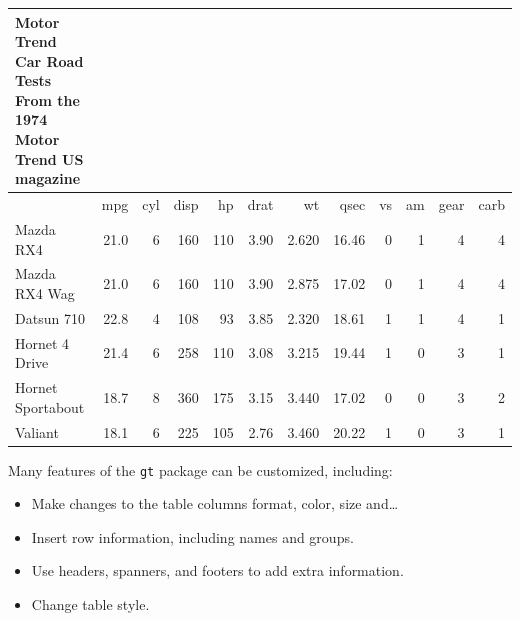 \documentclass[
]{book}
\providecommand{\tightlist}{%
  \setlength{\itemsep}{0pt}\setlength{\parskip}{0pt}}
\begin{document}
\captionsetup[table]{labelformat=empty,skip=1pt}
\begin{longtable}{lrrrrrrrrrrr}
\caption*{
{\large Motor Trend Car Road Tests} \\ 
{\small From the 1974 Motor Trend US magazine}
} \\ 
\toprule
 & mpg & cyl & disp & hp & drat & wt & qsec & vs & am & gear & carb \\ 
\midrule
Mazda RX4 & 21.0 & 6 & 160 & 110 & 3.90 & 2.620 & 16.46 & 0 & 1 & 4 & 4 \\ 
Mazda RX4 Wag & 21.0 & 6 & 160 & 110 & 3.90 & 2.875 & 17.02 & 0 & 1 & 4 & 4 \\ 
Datsun 710 & 22.8 & 4 & 108 & 93 & 3.85 & 2.320 & 18.61 & 1 & 1 & 4 & 1 \\ 
Hornet 4 Drive & 21.4 & 6 & 258 & 110 & 3.08 & 3.215 & 19.44 & 1 & 0 & 3 & 1 \\ 
Hornet Sportabout & 18.7 & 8 & 360 & 175 & 3.15 & 3.440 & 17.02 & 0 & 0 & 3 & 2 \\ 
Valiant & 18.1 & 6 & 225 & 105 & 2.76 & 3.460 & 20.22 & 1 & 0 & 3 & 1 \\ 
 \bottomrule
\end{longtable}

Many features of the \texttt{gt} package can be customized, including:

\begin{itemize}
\tightlist
\item
  Make changes to the table columns format, color, size and\ldots{}
\item
  Insert row information, including names and groups.
\item
  Use headers, spanners, and footers to add extra information.
\item
  Change table style.
\end{itemize}
\end{document}
